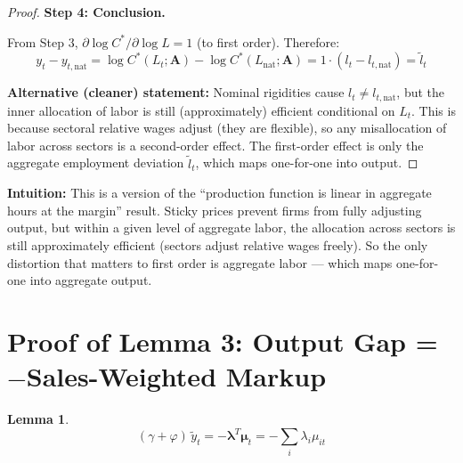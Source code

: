 \documentclass[12pt]{article}
\newtheorem{lemma}{Lemma}
\begin{document}
\begin{proof}
\medskip
\textbf{Step 4: Conclusion.}

From Step 3, $\partial \log C^*/\partial \log L = 1$ (to first order). Therefore:
\begin{equation}
    y_t - y_{t,\mathrm{nat}} = \log C^*(L_t;\mathbf{A}) - \log C^*(L_{\mathrm{nat}};\mathbf{A}) = 1 \cdot (l_t - l_{t,\mathrm{nat}}) = \tilde{l}_t
\end{equation}

\textbf{Alternative (cleaner) statement:} Nominal rigidities cause $l_t \neq l_{t,\mathrm{nat}}$, but the inner allocation of labor is still (approximately) efficient conditional on $L_t$. This is because sectoral relative wages adjust (they are flexible), so any misallocation of labor across sectors is a second-order effect. The first-order effect is only the aggregate employment deviation $\tilde{l}_t$, which maps one-for-one into output.
\end{proof}

\begin{insight}
\textbf{Intuition:} This is a version of the ``production function is linear in aggregate hours at the margin'' result. Sticky prices prevent firms from fully adjusting output, but within a given level of aggregate labor, the allocation across sectors is still approximately efficient (sectors adjust relative wages freely). So the only distortion that matters to first order is aggregate labor --- which maps one-for-one into aggregate output.
\end{insight}

\section{Proof of Lemma 3: Output Gap = $-$Sales-Weighted Markup}

\begin{lemma}
\begin{equation}
    (\gamma+\varphi)\,\tilde{y}_t = -\bm{\lambda}^T \bm{\mu}_t = -\sum_i \lambda_i \mu_{it}
\end{equation}
\end{lemma}
\end{document}
